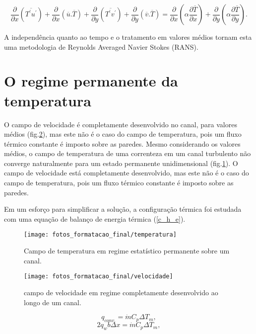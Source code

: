 \begin{equation}\label{energy permanent}
\frac{\partial{}}{\partial{x}} \left(\overline{T^\prime u^\prime}\right) + \frac{\partial{}}{\partial{x}}\left(\overline{u}.\overline{T}\right)     + 
\frac{\partial{}}{\partial{y}} \left(\overline{T^\prime v^\prime}\right) + \frac{\partial{}}{\partial{y}}\left(\overline{v}.\overline{T}\right) 
=
{\frac{\partial{}}{\partial{x}}} \left(\alpha {\frac{\partial{\overline{T}}}{\partial{x}}} \right) +
{\frac{\partial{}}{\partial{y}}} \left(\alpha {\frac{\partial{\overline{T}}}{\partial{y}}} \right). 
\end{equation}


A independência quanto ao tempo e o tratamento em valores médios tornam esta uma metodologia de Reynolds Averaged Navier Stokes (RANS).

\section{O regime permanente da temperatura}

O campo de velocidade é completamente desenvolvido no canal, para valores médios (fig.\ref{figure.3}), mas este não é o caso do campo de temperatura, pois um fluxo térmico constante é imposto sobre as paredes.
Mesmo considerando os valores médios, o campo de temperatura de uma correnteza em um canal turbulento não converge naturalmente para um estado permanente unidimensional (fig.\ref{figure.2}). O campo de velocidade está completamente desenvolvido, mas este não é o caso do campo de temperatura, pois um fluxo térmico constante é imposto sobre as paredes.

Em um esforço para simplificar a solução, a configuração térmica foi estudada com uma equação de balanço de energia térmica (\ref{c_h_e}).
\begin{figure}[h!]
	\centering
	\texttt{[image: fotos\_formatacao\_final/temperatura]}
	\caption{Campo de temperatura em regime estatístico permanente sobre um canal.}
	\label{figure.2}
\end{figure}
\begin{figure}[h!]
	\centering
	\texttt{[image: fotos\_formatacao\_final/velocidade]}
	\caption{campo de velocidade em regime completamente desenvolvido ao longo de um canal.}
	\label{figure.3}
\end{figure}


\begin{equation}\label{c_h_e}
q_{conv.} = \dot{m} C_p \Delta T_m,
\end{equation}
\begin{equation}
2q_w b \Delta x = \dot{m} C_p \Delta T_m,
\end{equation}\\



